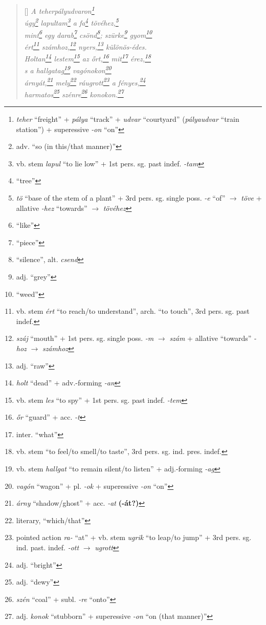 \documentclass[a4paper,12pt,twoside,final]{book}
\begin{document}

\newpage

\settowidth{\versewidth}{Csak ami nincs, annak van bokra,}

\begin{verse}[\versewidth]
  \it
  A teherpályudvaron\footnote{\emph{teher} ``freight'' + \emph{pálya}
  ``track'' + \emph{udvar} ``courtyard'' (\emph{pályaudvar} ``train
  station'') + superessive \emph{-on} ``on''} \\
  úgy\footnote{adv. ``so (in this/that manner)''}
  lapultam\footnote{vb. stem \emph{lapul} ``to lie low''
  + 1st pers. sg. past indef. \emph{-tam}} a
  fa\footnote{``tree''} tövéhez,\footnote{\emph{tö} ``base of the stem
  of a plant'' + 3rd pers. sg. single poss. \emph{-e} ``of''
  $\rightarrow$ \emph{töve} + allative \emph{-hez} ``towards''
  $\rightarrow$ \emph{tövéhez}} \\
  mint\footnote{``like''} egy darab\footnote{``piece''}
  csönd\footnote{``silence'', alt. \emph{csend}};
  szürke\footnote{adj. ``grey''} gyom\footnote{``weed''} \\
  ért\footnote{vb. stem \emph{ért} ``to reach/to understand'',
  arch. ``to touch'', 3rd pers. sg. past indef.}
  számhoz,\footnote{\emph{száj} ``mouth'' + 1st
  pers. sg. single poss. \emph{-m} $\rightarrow$ \emph{szám} +
  allative ``towards'' \emph{-hoz} $\rightarrow$ \emph{számhoz}}
  nyers,\footnote{adj. ``raw''} különös-édes. \\
  Holtan\footnote{\emph{holt} ``dead'' + adv.-forming \emph{-an}}
  lestem\footnote{vb. stem \emph{les} ``to spy'' + 1st
  pers. sg. past indef. \emph{-tem}} az őrt,\footnote{\emph{őr} ``guard'' +
  acc. \emph{-t}} mit\footnote{inter. ``what''}
  érez,\footnote{vb. stem ``to feel/to smell/to taste'',
  3rd pers. sg. ind. pres. indef.} \\
  s a hallgatag\footnote{vb. stem \emph{hallgat} ``to remain silent/to
  listen'' + adj.-forming \emph{-ag}} vagónokon\footnote{\emph{vagón}
  ``wagon'' + pl. \emph{-ok} + superessive \emph{-on} ``on''} \\
  árnyát,\footnote{\emph{árny} ``shadow/ghost'' +
  acc. \emph{-at} \textbf{(-át?)}} mely\footnote{literary,
  ``which/that''} ráugrott\footnote{pointed action \emph{ra-} ``at'' +
  vb. stem \emph{ugrik} ``to leap/to jump'' + 3rd
  pers. sg. ind. past. indef. \emph{-ott} $\rightarrow$ \emph{ugrott}} a
  fényes,\footnote{adj. ``bright''} \\
  harmatos\footnote{adj. ``dewy''} szénre\footnote{\emph{szén}
  ``coal'' + subl. \emph{-re} ``onto''}
  konokon.\footnote{adj. \emph{konok} ``stubborn'' +
  superessive \emph{-on} ``on (that manner)''}
\end{verse}
\end{document}

